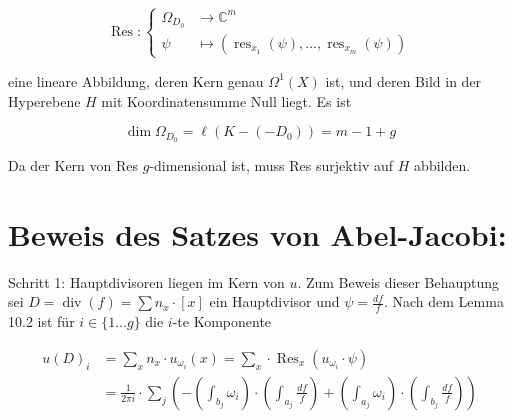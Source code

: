 \documentclass[10pt, letterpaper]{article}
\begin{document}
$$
\operatorname{Res}:\left\{\begin{aligned}
\Omega_{D_{0}} & \longrightarrow \mathbb{C}^{m} \\
\psi & \longmapsto\left(\operatorname{res}_{x_{1}}(\psi), \ldots, \operatorname{res}_{x_{m}}(\psi)\right)
\end{aligned}\right.
$$

eine lineare Abbildung, deren Kern genau $\Omega^{1}(X)$ ist, und deren Bild in der Hyperebene $H$ mit Koordinatensumme Null liegt. Es ist

$$
\operatorname{dim} \Omega_{D_{0}}=\ell\left(K-\left(-D_{0}\right)\right)=m-1+g
$$

Da der Kern von Res $g$-dimensional ist, muss Res surjektiv auf $H$ abbilden.

\section {Beweis des Satzes von Abel-Jacobi:}
Schritt 1: Hauptdivisoren liegen im Kern von $u$. Zum Beweis dieser Behauptung sei $D=\operatorname{div}(f)=\sum n_{x} \cdot[x]$ ein Hauptdivisor und $\psi=\frac{d f}{f}$. Nach dem Lemma 10.2 ist für $i \in\{1 \ldots g\}$ die $i$-te Komponente

$$
\begin{aligned}
u(D)_{i} & =\sum_{x} n_{x} \cdot u_{\omega_{i}}(x)=\sum_{x} \cdot \operatorname{Res}_{x}\left(u_{\omega_{i}} \cdot \psi\right) \\
& =\frac{1}{2 \pi i} \cdot \sum_{j}\left(-\left(\int_{b_{j}} \omega_{i}\right) \cdot\left(\int_{a_{j}} \frac{d f}{f}\right)+\left(\int_{a_{j}} \omega_{i}\right) \cdot\left(\int_{b_{j}} \frac{d f}{f}\right)\right)
\end{aligned}
$$
\end{document}
